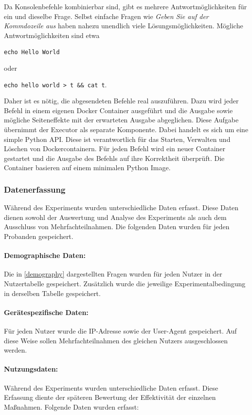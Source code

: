   Da Konsolenbefehle kombinierbar sind, gibt es mehrere Antwortmöglichkeiten für ein und dieselbe Frage. Selbst einfache Fragen wie \textit{Geben Sie  auf der Kommdozeile aus} haben nahezu unendlich viele Lösungsmöglichkeiten. Mögliche Antwortmöglichkeiten sind etwa 
  \begin{center}
      \verb|echo Hello World|
  \end{center}
  oder 
   \begin{center}
      \verb|echo hello world > t && cat t|.
  \end{center}
  Daher ist es nötig, die abgesendeten Befehle real auszuführen. Dazu wird jeder Befehl in einem eigenen Docker Container ausgeführt und die Ausgabe sowie mögliche Seiteneffekte mit der erwarteten Ausgabe abgeglichen. Diese Aufgabe übernimmt der Executor als separate Komponente. Dabei handelt es sich um eine simple Python API. Diese ist verantwortlich für das Starten, Verwalten und Löschen von Dockercontainern. Für jeden Befehl wird ein neuer Container gestartet und die Ausgabe des Befehls auf ihre Korrektheit überprüft. Die Container basieren auf einem minimalen Python Image. 


\subsubsection{Datenerfassung}
Während des Experiments wurden unterschiedliche Daten erfasst. Diese Daten dienen sowohl der Auswertung und Analyse des Experiments als auch dem Ausschluss von Mehrfachteilnahmen. Die folgenden Daten wurden für jeden Probanden gespeichert.

\paragraph{Demographische Daten:}
Die in \ref{demography} dargestellten Fragen wurden für jeden Nutzer in der Nutzertabelle gespeichert. Zusätzlich wurde die jeweilige Experimentalbedingung in derselben Tabelle gespeichert.

\paragraph{Gerätespezifische Daten:}
Für jeden Nutzer wurde die IP-Adresse sowie der User-Agent gespeichert. Auf diese Weise sollen Mehrfachteilnahmen des gleichen Nutzers ausgeschlossen werden.

\paragraph{Nutzungsdaten:}
Während des Experiments wurden unterschiedliche Daten erfasst. Diese Erfassung diente der späteren Bewertung der Effektivität der einzelnen Maßnahmen. Folgende Daten wurden erfasst:

